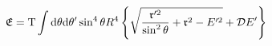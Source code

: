 \begin{equation*}
\frak{E}=\mathrm{T}\int \mathrm{d}\theta \mathrm{d}\theta ^{\prime }\sin
^{4}\theta R^{4}\left\{ \sqrt{\frac{\frak{r}^{\prime 2}}{\sin ^{2}\theta }+%
\frak{r}^{2}-E^{\prime 2}}+\mathcal{D}E^{\prime }\right\}
\end{equation*}

